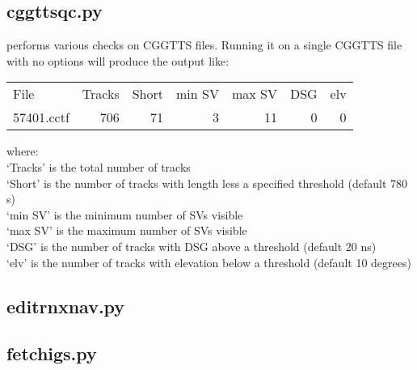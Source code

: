 \subsection{cggttsqc.py}

 performs various checks on CGGTTS files.
Running it on a single CGGTTS file with no options will produce the  output like:

\begin{tabular}{lrrrrrr}
File         & Tracks  & Short & min SV & max SV   &  DSG  &  elv \\
57401.cctf   &   706   &  71   &   3    &  11      & 0     &  0   \\
\end{tabular}

where:\\
`Tracks' is the total number of tracks\\
`Short'  is the number of tracks with length less a specified threshold (default 780 s)\\
`min SV' is the minimum number of SVs visible\\
`max SV' is the maximum number of SVs visible \\
`DSG'    is the number of tracks with DSG above a threshold (default 20 ns)\\
`elv'    is the number of tracks with elevation below a threshold (default 10 degrees)\\
	
\subsection{editrnxnav.py}

\subsection{fetchigs.py}
